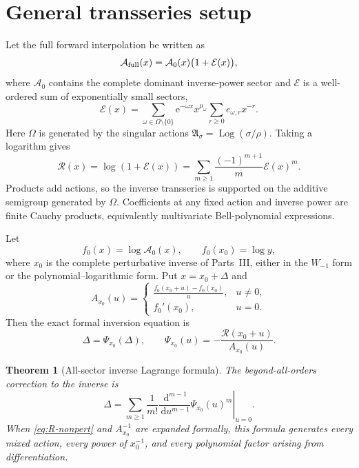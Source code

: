 \documentclass[11pt,a4paper,oneside,openany]{book}
\newtheorem{theorem}{Theorem}[chapter]
\theoremstyle{definition}
\theoremstyle{remark}
\newcommand{\e}{\mathrm e}
\newcommand{\dd}{\,\mathrm d}
\newcommand{\Action}{\mathfrak A}
\DeclareMathOperator{\Log}{Log}
\begin{document}
\section{General transseries setup}
Let the full forward interpolation be written as
\begin{equation}
 \mathcal A_{\rm full}(x)=\mathcal A_0(x)\bigl(1+\mathcal E(x)\bigr),
 \label{eq:full-forward-interpolant}
\end{equation}
where $\mathcal A_0$ contains the complete dominant inverse-power sector and
$\mathcal E$ is a well-ordered sum of exponentially small sectors,
\begin{equation}
 \mathcal E(x)=
 \sum_{\omega\in\Omega\setminus\{0\}}
 \e^{-\omega x}x^{\mu_\omega}
 \sum_{r\ge0}e_{\omega,r}x^{-r}.
 \label{eq:E-sectors}
\end{equation}
Here $\Omega$ is generated by the singular actions
$\Action_\sigma=\Log(\sigma/\rho)$.  Taking a logarithm gives
\begin{equation}
 \mathcal R(x)=\log(1+\mathcal E(x))
 =\sum_{m\ge1}\frac{(-1)^{m+1}}m\mathcal E(x)^m.
 \label{eq:R-nonpert}
\end{equation}
Products add actions, so the inverse transseries is supported on the additive
semigroup generated by $\Omega$.  Coefficients at any fixed action and inverse
power are finite Cauchy products, equivalently multivariate Bell-polynomial
expressions.

Let
\begin{equation}
 f_0(x)=\log\mathcal A_0(x),
 \qquad f_0(x_0)=\log y,
 \label{eq:f0-x0}
\end{equation}
where $x_0$ is the complete perturbative inverse of Parts~III, either in the
$W_{-1}$ form or the polynomial--logarithmic form.  Put $x=x_0+\Delta$ and
\begin{equation}
 A_{x_0}(u)=
 \begin{cases}
 \displaystyle\frac{f_0(x_0+u)-f_0(x_0)}{u},&u\ne0,\\[2mm]
 f_0'(x_0),&u=0.
 \end{cases}
 \label{eq:A-x0}
\end{equation}
Then the exact formal inversion equation is
\begin{equation}
 \Delta=\Psi_{x_0}(\Delta),
 \qquad
 \Psi_{x_0}(u)=-\frac{\mathcal R(x_0+u)}{A_{x_0}(u)}.
 \label{eq:Delta-fixed}
\end{equation}

\begin{theorem}[All-sector inverse Lagrange formula]
\label{thm:all-sector-inverse}
The beyond-all-orders correction to the inverse is
\begin{equation}
 \boxed{
 \Delta=
 \sum_{m\ge1}\frac1{m!}
 \left.\frac{\dd^{m-1}}{\dd u^{m-1}}
 \Psi_{x_0}(u)^m\right|_{u=0}.}
 \label{eq:Delta-Lagrange}
\end{equation}
When \cref{eq:R-nonpert} and $A_{x_0}^{-1}$ are expanded formally, this formula
generates every mixed action, every power of $x_0^{-1}$, and every polynomial
factor arising from differentiation.
\end{theorem}
\end{document}
